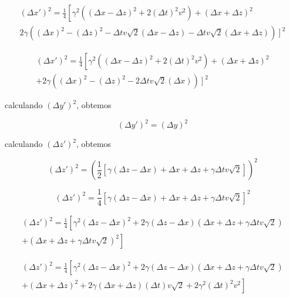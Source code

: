 \documentclass[10pt,a4paper]{article}
\begin{document}
\begin{equation}\nonumber
	\begin{split}
		(\Delta x')^2 = \frac{1}{4}\left[\gamma^2((\Delta x- \Delta z)^2 +2(\Delta t)^2v^2)+ (\Delta x+ \Delta z)^2 \right.\\
		2\gamma((\Delta x)^2- (\Delta z)^2-\Delta tv\sqrt{2}(\Delta x- \Delta z)-\Delta tv\sqrt{2}(\Delta x+ \Delta z)) 
		\left.\right]^2
	\end{split}
\end{equation}

\begin{equation}\nonumber
	\begin{split}
		(\Delta x')^2 = \frac{1}{4}\left[\gamma^2((\Delta x- \Delta z)^2 +2(\Delta t)^2v^2)+ (\Delta x+ \Delta z)^2 \right.\\
		+2\gamma((\Delta x)^2- (\Delta z)^2-2\Delta tv\sqrt{2}(\Delta x))\left.\right]^2
	\end{split}
\end{equation}

calculando $ (\Delta y')^2 $, obtemos

$$(\Delta y')^2 =(\Delta y)^2$$

calculando $ (\Delta z')^2 $, obtemos

$$ (\Delta z')^2=(\frac{1}{2}\left[\gamma(\Delta z- \Delta x)+\Delta x+\Delta z+\gamma \Delta tv\sqrt{2}\right])^2$$

$$ (\Delta z')^2=\frac{1}{4}\left[\gamma(\Delta z- \Delta x)+\Delta x+\Delta z+\gamma \Delta tv\sqrt{2}\right]^2$$

\begin{equation*}
	\begin{split}
		(\Delta z')^2=\frac{1}{4}\left[\gamma^2(\Delta z- \Delta x)^2+2\gamma(\Delta z- \Delta x)(\Delta x+\Delta z+\gamma \Delta tv\sqrt{2})\right.\\
		\left.+(\Delta x+\Delta z+\gamma \Delta tv\sqrt{2})^2\right]
	\end{split}
\end{equation*}

\begin{equation*}
	\begin{split}
		(\Delta z')^2=\frac{1}{4}\left[\gamma^2(\Delta z- \Delta x)^2+2\gamma(\Delta z- \Delta x)(\Delta x+\Delta z+\gamma \Delta tv\sqrt{2})\right.\\
		\left.+(\Delta x+\Delta z)^2+2\gamma(\Delta x+\Delta z) (\Delta t)v\sqrt{2}+2\gamma^2 (\Delta t)^2v^2\right]
	\end{split}
\end{equation*}
\end{document}
